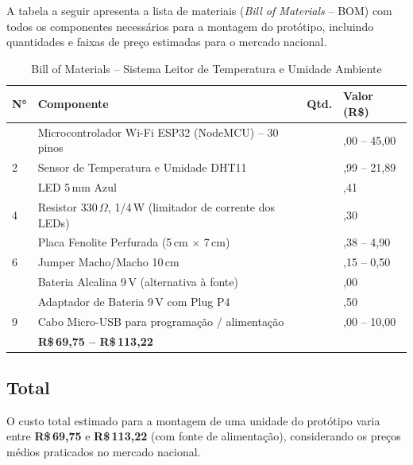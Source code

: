 A tabela a seguir apresenta a lista de materiais (\textit{Bill of Materials} -- BOM) com todos os componentes necessários para a montagem do protótipo, incluindo quantidades e faixas de
preço estimadas para o mercado nacional.

\begin{table}[H]
\centering
\begin{tabularx}{\textwidth}{
    >{\centering\arraybackslash}p{0.55cm}
    X
    >{\centering\arraybackslash}p{2.0cm}
    >{\centering\arraybackslash}p{2.8cm}}
\hline
\rowcolor[HTML]{92D050}
\textbf{N°} & \textbf{Componente} & \textbf{Qtd.} & \textbf{Valor (R\$)} \\
\hline
1  & Microcontrolador Wi-Fi ESP32 (NodeMCU) -- 30 pinos & 1 & 25,00 -- 45,00 \\
\rowcolor[gray]{0.92}
2  & Sensor de Temperatura e Umidade DHT11 & 1 & 6,99 -- 21,89 \\
3  & LED 5\,mm Azul & 3 & 0,41 \\
\rowcolor[gray]{0.92}
4  & Resistor 330\,$\Omega$, 1/4\,W (limitador de corrente dos LEDs) & 4 & 0,30 \\
5  & Placa Fenolite Perfurada (5\,cm $\times$ 7\,cm) & 1 & 2,38 -- 4,90 \\
\rowcolor[gray]{0.92}
6  & Jumper Macho/Macho 10\,cm & 3 & 0,15 -- 0,50 \\
7 & Bateria Alcalina 9\,V (alternativa à fonte) & 1 & 25,00 \\
8 & Adaptador de Bateria 9\,V com Plug P4 & 1 & 2,50 \\
\rowcolor[gray]{0.92}
9 & Cabo Micro-USB para programação / alimentação & 1 & 5,00 -- 10,00 \\
\hline
\multicolumn{3}{r}{\textbf{Valor Total Estimado ( configuração com fonte)}}
& \textbf{R\$\,69,75 -- R\$\,113,22} \\
\hline
\end{tabularx}
\caption{Bill of Materials -- Sistema Leitor de Temperatura e Umidade Ambiente}
\end{table}

\subsection{Total}

O custo total estimado para a montagem de uma unidade do protótipo varia entre \textbf{R\$\,69,75} e \textbf{R\$\,113,22} (com fonte de alimentação), considerando os preços médios praticados no mercado nacional.